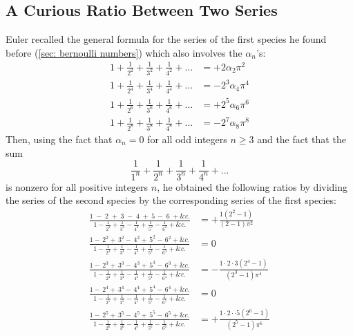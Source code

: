 \subsection*{A Curious Ratio Between Two Series}

Euler recalled the general formula for the series of the first species he found before (\autoref{sec: bernoulli numbers}) which also involves the $\alpha_n$'s:
\begin{align*}
    1 + \frac{1}{2^2} + \frac{1}{3^2} + \frac{1}{4^2} + \dots &= +2 \alpha_2 \pi^2 \\
    1 + \frac{1}{2^4} + \frac{1}{3^4} + \frac{1}{4^4} + \dots &= -2^3 \alpha_4 \pi^4 \\
    1 + \frac{1}{2^6} + \frac{1}{3^6} + \frac{1}{4^6} + \dots &= +2^5 \alpha_6 \pi^6 \\
    1 + \frac{1}{2^8} + \frac{1}{3^8} + \frac{1}{4^8} + \dots &= - 2^7 \alpha_8 \pi^8
\end{align*}
Then, using the fact that $\alpha_n = 0$ for all odd integers $n \geq 3$ and the fact that the sum
$$\frac{1}{1^n} + \frac{1}{2^n} + \frac{1}{3^n} + \frac{1}{4^n} + ...$$
is nonzero for all positive integers $n$, he obtained the following ratios by dividing the series of the second species by the corresponding series of the first species:
\begin{align*}
  \frac{1 \; - \; 2 \; + \; 3 \;- \; 4 \; + \; 5 \,  - \;  6 \; + \&c.}{\displaystyle 1 - \frac{1}{2^2} + \frac{1}{3^2} - \frac{1}{4^2} + \frac{1}{5^2} - \frac{1}{6^2} + \&c.} &= + \frac{1(2^2-1)}{(2-1)\pi^2} \\
  \frac{1 - \, 2^2 + \, 3^2- \, 4^2 + \, 5^2  - \,  6^2 + \&c.}{\displaystyle 1 - \frac{1}{2^3} + \frac{1}{3^3} - \frac{1}{4^3} + \frac{1}{5^3} - \frac{1}{6^3} + \&c.} &= 0 \\
  \frac{1 - \, 2^3 + \, 3^3- \, 4^3 + \, 5^3  - \,  6^3 + \&c.}{\displaystyle 1 - \frac{1}{2^4} + \frac{1}{3^4} - \frac{1}{4^4} + \frac{1}{5^4} - \frac{1}{6^4} + \&c.} &= - \frac{1\cdot 2 \cdot 3(2^4 - 1)}{(2^3 - 1)\pi^4} \\
  \frac{1 - \, 2^4 + \, 3^4- \, 4^4 + \, 5^4  - \,  6^4 + \&c.}{\displaystyle 1 - \frac{1}{2^5} + \frac{1}{3^5} - \frac{1}{4^5} + \frac{1}{5^5} - \frac{1}{6^5} + \&c.} &= 0 \\
  \frac{1 - \, 2^5 + \, 3^5- \, 4^5 + \, 5^5  - \,  6^5 + \&c.}{\displaystyle 1 - \frac{1}{2^6} + \frac{1}{3^6} - \frac{1}{4^6} + \frac{1}{5^6} - \frac{1}{6^6} + \&c.} &= + \frac{1\cdot 2 \cdot \cdot 5(2^6 - 1)}{(2^5 - 1)\pi^6}
\end{align*}
